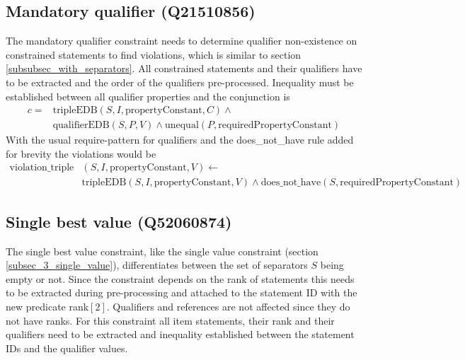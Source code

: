 \documentclass[hyperref,bachelorofscience,fleqn]{cgvpub}
\begin{document}
\subsection{Mandatory qualifier (Q21510856)}
The mandatory qualifier constraint needs to determine qualifier non-existence on constrained statements to find violations, which is similar to section \ref{subsubsec_with_separators}. All constrained statements and their qualifiers have to be extracted and the order of the qualifiers pre-processed. Inequality must be established between all qualifier properties and the conjunction is 
\begin{equation*}
\begin{split}
c = &\text{tripleEDB}(S, I, \text{propertyConstant}, C) \wedge \\
&\text{qualifierEDB}(S, P, V) \wedge \text{unequal}(P, \text{requiredPropertyConstant})
\end{split}
\end{equation*}
With the usual require-pattern for qualifiers and the does\_not\_have rule added for brevity the violations would be
\begin{equation*}
\begin{split}
\text{violation\_triple}&(S, I, \text{propertyConstant}, V) \leftarrow \\
&\text{tripleEDB}(S, I, \text{propertyConstant}, V) \wedge \text{does\_not\_have}(S, \text{requiredPropertyConstant})
\end{split}
\end{equation*}

\subsection{Single best value (Q52060874)}
The single best value constraint, like the single value constraint (section \ref{subsec_3_single_value}), differentiates between the set of separators \(S\) being empty or not. Since the constraint depends on the rank of statements this needs to be extracted during pre-processing and attached to the statement ID with the new predicate rank\([2]\). Qualifiers and references are not affected since they do not have ranks. For this constraint all item statements, their rank and their qualifiers need to be extracted and inequality established between the statement IDs and the qualifier values.\\
\end{document}
